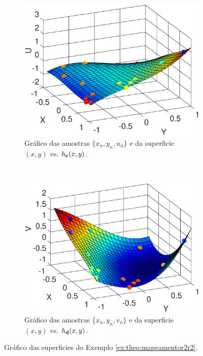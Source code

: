 \begin{figure}[!h]
\centering
    \begin{subfigure}[b]{0.45\textwidth}
        \centering
        \includegraphics[width=\textwidth]{chapters/mapeamento/mfiles/mapeamentor2r2/minimizando_hxc.eps}
        \caption{Gráfico das amostras $\{x_n,y_n,u_n\}$ e da superficie $(x,y)$ vs. $h_{\VECTOR{c}}(x,y)$.}
        \label{fig:theo:maphxr2r1:xnynun}
    \end{subfigure}
    ~
    \begin{subfigure}[b]{0.45\textwidth}
        \centering
        \includegraphics[width=\textwidth]{chapters/mapeamento/mfiles/mapeamentor2r2/minimizando_hxd.eps}
        \caption{Gráfico das amostras $\{x_n,y_n,v_n\}$ e da superficie $(x,y)$ vs. $h_{\VECTOR{d}}(x,y)$.}
        \label{fig:theo:maphxr2r1:xnynvn}
    \end{subfigure}
\caption{Gráfico das superficies do Exemplo \ref{ex:theo:mapeamentor2r2}.}
\label{fig:theo:maphxr2r1:xnynunvn}
\end{figure}
